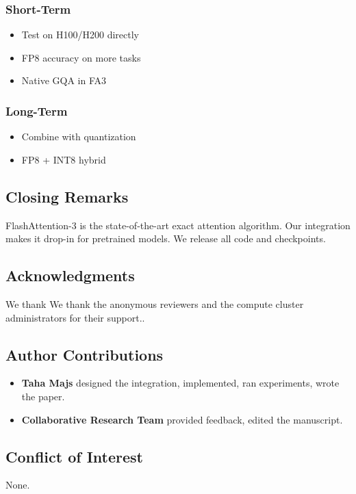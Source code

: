 \subsubsection{Short-Term}
\begin{itemize}
\item Test on H100/H200 directly
\item FP8 accuracy on more tasks
\item Native GQA in FA3

\end{itemize}
\subsubsection{Long-Term}
\begin{itemize}
\item Combine with quantization
\item FP8 + INT8 hybrid

\end{itemize}
\subsection{Closing Remarks}

FlashAttention-3 is the state-of-the-art exact attention algorithm. Our 
integration makes it drop-in for pretrained models. We release all code 
and checkpoints.

\subsection{Acknowledgments}

We thank We thank the anonymous reviewers and the compute cluster administrators for their support..

\subsection{Author Contributions}

\begin{itemize}
\item \textbf{Taha Majs} designed the integration, implemented, ran experiments,
  wrote the paper.
\item \textbf{Collaborative Research Team} provided feedback, edited the manuscript.

\end{itemize}
\subsection{Conflict of Interest}

None.

